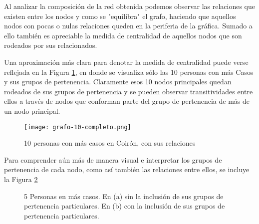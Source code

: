 Al analizar la composición de la red obtenida podemos observar las relaciones que existen entre los nodos y como se "equilibra" el grafo, haciendo que aquellos nodos con pocas o nulas relaciones queden en la periferia de la gráfica. Sumado a ello también es apreciable la medida de centralidad de aquellos nodos que son rodeados por sus relacionados.

Una aproximación más clara para denotar la medida de centralidad puede verse reflejada en la Figura \ref{fig:grafoTop10}, en donde se visualiza sólo las 10 personas con más Casos y sus grupos de pertenencia. Claramente esos 10 nodos principales quedan rodeados de sus grupos de pertenencia y se pueden observar transitividades entre ellos a través de nodos que conforman parte del grupo de pertenencia de más de un nodo principal.

\begin{figure}
	\texttt{[image: grafo-10-completo.png]}
	\caption{10 personas con más casos en Coirón, con sus relaciones} 
	\label{fig:grafoTop10}
\end{figure}

Para comprender aún más de manera visual e interpretar los grupos de pertenencia de cada nodo, como así también las relaciones entre ellos, se incluye la Figura \ref{fig:grafoTop5}

\begin{figure}[htbp]
	\centering
	\centering
	\caption{ 5 Personas en más casos. En (a) sin la inclusión de sus grupos de pertenencia particulares. En (b) con la inclusión de sus grupos de pertenencia particulares.}
	\label{fig:grafoTop5}
\end{figure}

